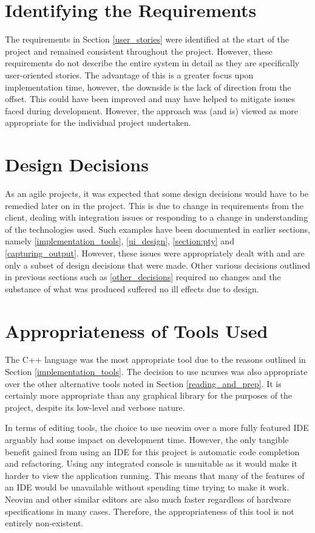 \section{Identifying the Requirements}

The requirements in Section \ref{user_stories} were identified at the start of the project and remained consistent throughout the project. However, these requirements do not describe the entire system in detail as they are specifically user-oriented stories. The advantage of this is a greater focus upon implementation time, however, the downside is the lack of direction from the offset. This could have been improved and may have helped to mitigate issues faced during development. However, the approach was (and is) viewed as more appropriate for the individual project undertaken.

\section{Design Decisions}

As an agile projects, it was expected that some design decisions would have to be remedied later on in the project. This is due to change in requirements from the client, dealing with integration issues or responding to a change in understanding of the technologies used. Such examples have been documented in earlier sections, namely \ref{implementation_tools}, \ref{ui_design}, \ref{section:pty} and \ref{capturing_output}. However, these issues were appropriately dealt with and are only a subset of design decisions that were made. Other various decisions outlined in previous sections such as \ref{other_decisions} required no changes and the substance of what was produced suffered no ill effects due to design.

\section{Appropriateness of Tools Used}

The C++ language was the most appropriate tool due to the reasons outlined in Section \ref{implementation_tools}. The decision to use ncurses was also appropriate over the other alternative tools noted in Section \ref{reading_and_prep}. It is certainly more appropriate than any graphical library for the purposes of the project, despite its low-level and verbose nature.

In terms of editing tools, the choice to use neovim over a more fully featured IDE arguably had some impact on development time. However, the only tangible benefit gained from using an IDE for this project is automatic code completion and refactoring. Using any integrated console is unsuitable as it would make it harder to view the application running. This means that many of the features of an IDE would be unavailable without spending time trying to make it work. Neovim and other similar editors are also much faster regardless of hardware specifications in many cases. Therefore, the appropriateness of this tool is not entirely non-existent.


